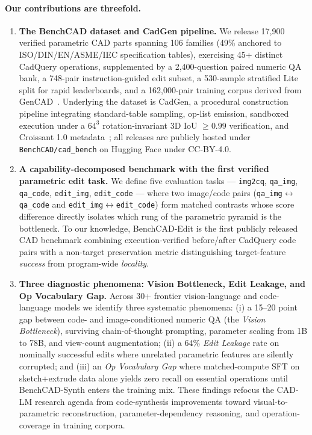 \documentclass{article}
\begin{document}
\paragraph{Our contributions are threefold.}
\begin{enumerate}[leftmargin=1.4em,topsep=4pt,itemsep=4pt]
  \item \textbf{The BenchCAD dataset and CadGen pipeline.} We release 17{,}900 verified parametric CAD parts spanning 106 families (49\% anchored to ISO/DIN/EN/ASME/IEC specification tables), exercising 45+ distinct CadQuery operations, supplemented by a 2{,}400-question paired numeric QA bank, a 748-pair instruction-guided edit subset, a 530-sample stratified Lite split for rapid leaderboards, and a 162{,}000-pair training corpus derived from GenCAD~\citep{GenCAD2025}. Underlying the dataset is CadGen, a procedural construction pipeline integrating standard-table sampling, op-list emission, sandboxed execution under a $64^3$ rotation-invariant 3D IoU $\geq 0.99$ verification, and Croissant 1.0 metadata~\citep{Croissant2024}; all releases are publicly hosted under \texttt{BenchCAD/cad\_bench} on Hugging Face under CC-BY-4.0.
  \item \textbf{A capability-decomposed benchmark with the first verified parametric edit task.} We define five evaluation tasks --- \texttt{img2cq}, \texttt{qa\_img}, \texttt{qa\_code}, \texttt{edit\_img}, \texttt{edit\_code} --- where two image/code pairs (\texttt{qa\_img}$\leftrightarrow$\texttt{qa\_code} and \texttt{edit\_img}$\leftrightarrow$\texttt{edit\_code}) form matched contrasts whose score difference directly isolates which rung of the parametric pyramid is the bottleneck. To our knowledge, BenchCAD-Edit is the first publicly released CAD benchmark combining execution-verified before/after CadQuery code pairs with a non-target preservation metric distinguishing target-feature \emph{success} from program-wide \emph{locality}.
  \item \textbf{Three diagnostic phenomena: Vision Bottleneck, Edit Leakage, and Op Vocabulary Gap.} Across 30+ frontier vision-language and code-language models we identify three systematic phenomena: (i) a 15--20 point gap between code- and image-conditioned numeric QA (the \emph{Vision Bottleneck}), surviving chain-of-thought prompting, parameter scaling from 1B to 78B, and view-count augmentation; (ii) a 64\% \emph{Edit Leakage} rate on nominally successful edits where unrelated parametric features are silently corrupted; and (iii) an \emph{Op Vocabulary Gap} where matched-compute SFT on sketch+extrude data alone yields zero recall on essential operations until BenchCAD-Synth enters the training mix. These findings refocus the CAD-LM research agenda from code-synthesis improvements toward visual-to-parametric reconstruction, parameter-dependency reasoning, and operation-coverage in training corpora.
\end{enumerate}
\end{document}
